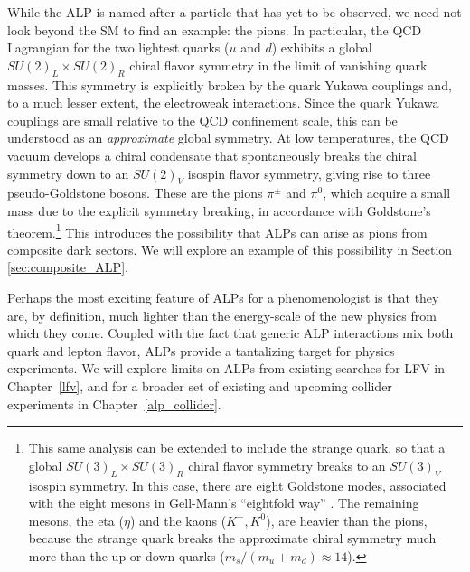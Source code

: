 {While the ALP is named after a particle that has yet to be observed, we need not look beyond the SM to find an example: the pions. In particular, the QCD Lagrangian for the two lightest quarks ($u$ and $d$) exhibits a global $SU(2)_L\times SU(2)_R$ chiral flavor symmetry in the limit of vanishing quark masses. This symmetry is explicitly broken by the quark Yukawa couplings and, to a much lesser extent, the electroweak interactions. Since the quark Yukawa couplings are small relative to the QCD confinement scale, this can be understood as an {\it approximate} global symmetry. At low temperatures, the QCD vacuum develops a chiral condensate that spontaneously breaks the chiral symmetry down to an $SU(2)_V$ isospin flavor symmetry, giving rise to three pseudo-Goldstone bosons. These are the pions $\pi^\pm$ and $\pi^0$, which acquire a small mass due to the explicit symmetry breaking, in accordance with Goldstone's theorem.\footnote{This same analysis can be extended to include the strange quark, so that a global $SU(3)_L \times SU(3)_R$ chiral flavor symmetry breaks to an $SU(3)_V$ isospin symmetry. In this case, there are eight Goldstone modes, associated with the eight mesons in Gell-Mann's ``eightfold way'' \cite{Gell-Mann:1961omu}. The remaining mesons, the eta ($\eta$) and the kaons ($K^\pm, K^0$), are heavier than the pions, because the strange quark breaks the approximate chiral symmetry much more than the up or down quarks ($m_s/(m_u + m_d) \approx 14$).} This introduces the possibility that ALPs can arise as pions from composite dark sectors. We will explore an example of this possibility in Section \ref{sec:composite_ALP}. 

Perhaps the most exciting feature of ALPs for a phenomenologist is that they are, by definition, much lighter than the energy-scale of the new physics from which they come. Coupled with the fact that generic ALP interactions mix both quark and lepton flavor, ALPs provide a tantalizing target for physics experiments. We will explore limits on ALPs from existing searches for LFV in Chapter~\ref{lfv}, and for a broader set of existing and upcoming collider experiments in Chapter~\ref{alp_collider}.


}
